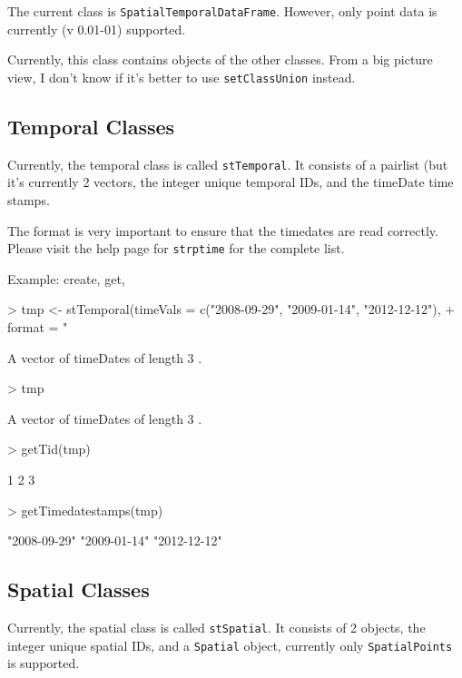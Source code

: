 \documentclass{article}
\begin{document}
The current class is \texttt{SpatialTemporalDataFrame}.  However, only
point data is currently (v 0.01-01) supported.  

Currently, this class contains objects of the other classes.  From a
big picture view, I don't know if it's better to use
\texttt{setClassUnion} instead.

\subsection*{Temporal Classes}
Currently, the temporal class is called \texttt{stTemporal}.  It
consists of a pairlist (but it's currently 2 vectors, the integer
unique temporal IDs, and the timeDate time stamps.

The format is very important to ensure that the timedates are read
correctly.  Please visit the help page for \texttt{strptime} for the
complete list.

Example: create, get,
\begin{Schunk}
\begin{Sinput}
> tmp <- stTemporal(timeVals = c("2008-09-29", "2009-01-14", "2012-12-12"), 
+     format = "%Y-%m-%d")
\end{Sinput}
\begin{Soutput}
A vector of timeDates of length 3 .
\end{Soutput}
\begin{Sinput}
> tmp
\end{Sinput}
\begin{Soutput}
A vector of timeDates of length 3 .
\end{Soutput}
\begin{Sinput}
> getTid(tmp)
\end{Sinput}
\begin{Soutput}
[1] 1 2 3
\end{Soutput}
\begin{Sinput}
> getTimedatestamps(tmp)
\end{Sinput}
\begin{Soutput}
[1] "2008-09-29" "2009-01-14" "2012-12-12"
\end{Soutput}
\end{Schunk}


\subsection*{Spatial Classes}
Currently, the spatial class is called \texttt{stSpatial}.  It
consists of 2 objects, the integer
unique spatial IDs, and a \texttt{Spatial} object, currently only
\texttt{SpatialPoints} is supported.
\end{document}
